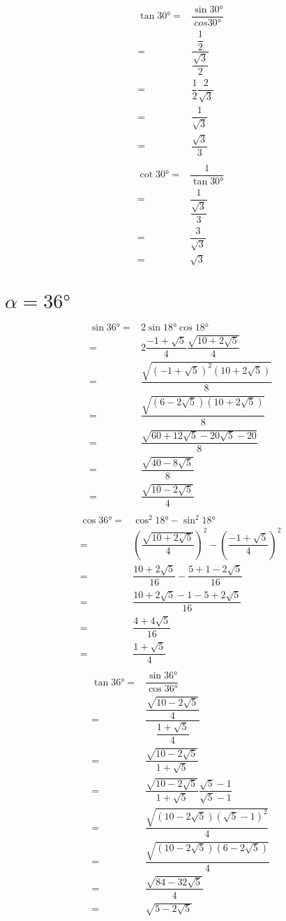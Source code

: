 \begin{align*}
	\tan\ang{30}=&\dfrac{\sin\ang{30}}{cos\ang{30}}\\
	=&\dfrac{\dfrac{1}{2}}{\dfrac{\sqrt{3}}{2}}\\
	=&\dfrac{1}{2}\dfrac{2}{\sqrt{3}}\\
		=&\dfrac{1}{\sqrt{3}}\\
		=&\dfrac{\sqrt{3}}{3}\\
\end{align*}
\begin{align*}
	\cot\ang{30}=&\dfrac{1}{\tan\ang{30}}\\
	=&\dfrac{1}{\dfrac{\sqrt{3}}{3}}\\
	=&\dfrac{3}{\sqrt{3}}\\
	=&\sqrt{3}
\end{align*}
\section{$\alpha=\ang{36}$}
\begin{align*}
	\sin\ang{36}=&2\sin\ang{18}\cos\ang{18}\\
	=&2\dfrac{-1+\sqrt{5}}{4}\dfrac{\sqrt{10+2\sqrt{5}}}{4}\\
	=&\dfrac{\sqrt{(-1+\sqrt{5})^2(10+2\sqrt{5})}}{8}\\
	=&\dfrac{\sqrt{(6-2\sqrt{5})(10+2\sqrt{5})}}{8}\\
	=&\dfrac{\sqrt{60+12\sqrt{5}-20\sqrt{5}-20}}{8}\\
	=&\dfrac{\sqrt{40-8\sqrt{5}}}{8}\\
	=&\dfrac{\sqrt{10-2\sqrt{5}}}{4}\\
\end{align*}
\begin{align*}
	\cos\ang{36}=&\cos^2\ang{18}-\sin^2\ang{18}\\
	=&\left(\dfrac{\sqrt{10+2\sqrt{5}}}{4}\right)^2-\left(\dfrac{-1+\sqrt{5}}{4}\right)^2\\
	=&\dfrac{10+2\sqrt{5}}{16}-\dfrac{5+1-2\sqrt{5}}{16}\\
	=&\dfrac{10+2\sqrt{5}-1-5+2\sqrt{5}}{16}\\
		=&\dfrac{4+4\sqrt{5}}{16}\\
		=&\dfrac{1+\sqrt{5}}{4}\\
\end{align*}
\begin{align*}
	\tan\ang{36}=&\dfrac{\sin\ang{36}}{\cos\ang{36}}\\
	=&\dfrac{\dfrac{\sqrt{10-2\sqrt{5}}}{4}}{\dfrac{1+\sqrt{5}}{4}}\\
	=&\dfrac{\sqrt{10-2\sqrt{5}}}{1+\sqrt{5}}\\
	=&\dfrac{\sqrt{10-2\sqrt{5}}}{1+\sqrt{5}}\dfrac{\sqrt{5}-1}{\sqrt{5}-1}\\
	=&\dfrac{\sqrt{(10-2\sqrt{5})(\sqrt{5}-1)^2}}{4}\\
	=&\dfrac{\sqrt{(10-2\sqrt{5})(6-2\sqrt{5})}}{4}\\
	=&\dfrac{\sqrt{84-32\sqrt{5}}}{4}\\
	=&\sqrt{5-2\sqrt{5}}
\end{align*}
